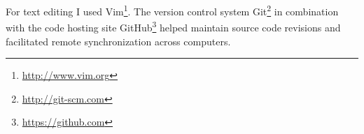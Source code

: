 For text editing I used Vim\footnote{\url{http://www.vim.org}}. The version
control system Git\footnote{\url{http://git-scm.com}} in combination with the
code hosting site GitHub\footnote{\url{https://github.com}} helped maintain
source code revisions and facilitated remote synchronization across computers.
